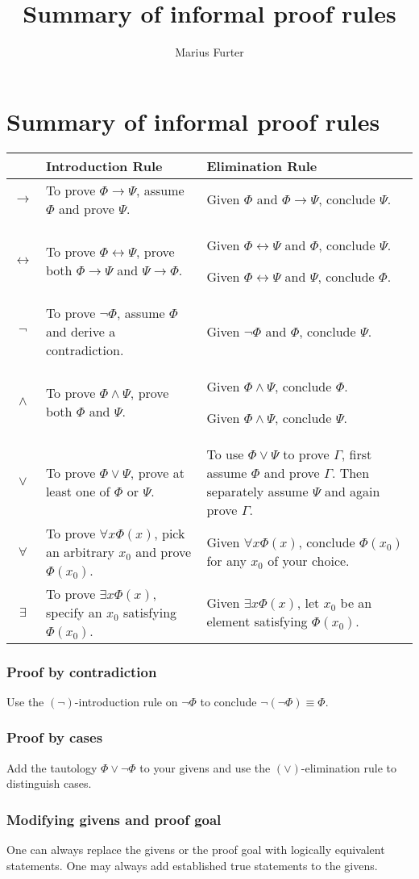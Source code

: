 \documentclass{article}[12pt]
\title{Summary of informal proof rules}
\author{Marius Furter}
\begin{document}
\section*{Summary of informal proof rules}

\begin{tabular}{ c | m{14em} | m{14em} }
    & \textbf{Introduction Rule} & \textbf{Elimination Rule} \\ 
    \hline \hline
    $\rightarrow$ &
    To prove $\Phi \rightarrow \Psi$, assume $\Phi$ and prove $\Psi$. &
    Given $\Phi$ and $\Phi \rightarrow \Psi$, conclude $\Psi$. \\
    \hline
    $\leftrightarrow$ &
    To prove $\Phi \leftrightarrow \Psi$, prove both $\Phi \rightarrow \Psi$ and $\Psi \rightarrow \Phi$. &
    Given $\Phi \leftrightarrow \Psi$ and $\Phi$, conclude $\Psi$.

    Given $\Phi \leftrightarrow \Psi$ and $\Psi$, conclude $\Phi$. \\
    \hline
    $\neg$ &
    To prove $\neg \Phi$, assume $\Phi$ and derive a contradiction. &
    Given $\neg \Phi$ and $\Phi$, conclude $\Psi$. \\
    \hline
    $\wedge $ &
    To prove $\Phi \wedge \Psi$, prove both $\Phi$ and $\Psi$. &
    Given $\Phi \wedge \Psi$, conclude $\Phi$.
    
    Given $\Phi \wedge \Psi$, conclude $\Psi$.\\
    \hline
    $\vee$ &
    To prove $\Phi \vee \Psi$, prove at least one of $\Phi$ or $\Psi$. &
    To use $\Phi \vee \Psi$ to prove $\Gamma$, first assume $\Phi$ and prove $\Gamma$. Then separately assume $\Psi$ and again prove $\Gamma$. \\
    \hline
    $\forall$ &
    To prove $\forall x \Phi(x)$, pick an arbitrary $x_0$ and prove $\Phi(x_0)$. &
    Given $\forall x \Phi(x)$, conclude $\Phi(x_0)$ for any $x_0$ of your choice. \\
    \hline
    $\exists$ &
    To prove $\exists x \Phi(x)$, specify an $x_0$ satisfying $\Phi(x_0)$. &
    Given $\exists x \Phi(x)$, let $x_0$ be an element satisfying $\Phi(x_0)$. \\
    \hline
\end{tabular}

\subsubsection*{Proof by contradiction}
Use the $(\neg)$-introduction rule on $\neg \Phi$ to conclude $\neg(\neg \Phi) \equiv \Phi$.

\subsubsection*{Proof by cases}
Add the tautology $\Phi \vee \neg \Phi$ to your givens and use the $(\vee)$-elimination rule to distinguish cases.

\subsubsection*{Modifying givens and proof goal}
One can always replace the givens or the proof goal with logically equivalent statements. One may always add established true statements to the givens.
\end{document}
